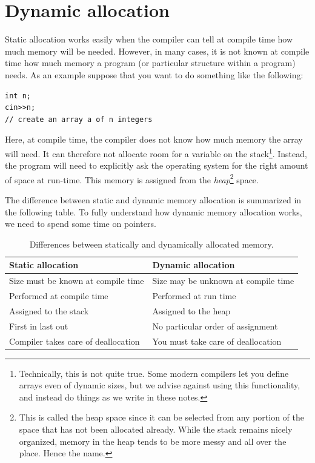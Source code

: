 \section{Dynamic allocation}
Static allocation works easily when the compiler can tell at compile
time how much memory will be needed.
However, in many cases, it is not known at compile time how much
memory a program (or particular structure within a program) needs.
As an example suppose that you want to do something like the following:

\begin{verbatim}
int n;
cin>>n;
// create an array a of n integers
\end{verbatim}

Here, at compile time, the compiler does not know how much memory the
array will need. It can therefore not allocate room for a variable on
the stack\footnote{Technically, this is not quite true. Some modern
  compilers let you define arrays even of dynamic sizes, but we advise
  against using this functionality, and instead do things as we write
  in these notes.}.
Instead, the program will need to explicitly ask the operating system
for the right amount of space at run-time. 
This memory is assigned from the \emph{heap}\footnote{This is called
  the heap space since it can be selected from any portion of the
  space that has not been allocated already. While the stack remains
  nicely organized, memory in the heap tends to be more messy and all
  over the place. Hence the name.} space. 

The difference between static and dynamic memory allocation is
summarized in the following table.
To fully understand how dynamic memory allocation works,
we need to spend some time on pointers.

\begin{table}[h]
	\centering
    \begin{tabular}{l|l}
       \textbf{Static allocation}         & \textbf{Dynamic allocation}                \\ \hline
        Size must be known at compile time & Size may be unknown at compile time \\
        Performed at compile time & Performed at run time             \\ 
        Assigned to the stack     & Assigned to the heap              \\ 
        First in last out         & No particular order of assignment \\
        Compiler takes care of deallocation & You must take care of
                                              deallocation \\
    \end{tabular}
\caption{Differences between statically and dynamically allocated memory.}
\end{table}

